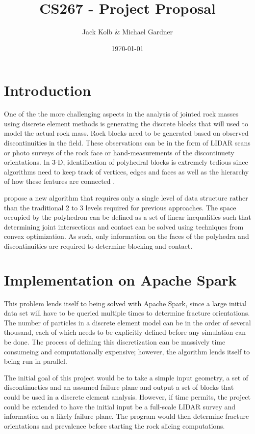 \documentclass[american]{article}
\begin{document}
\title{CS267 - Project Proposal}
\author{Jack Kolb \& Michael Gardner}
\date{\today}
\maketitle

\section{Introduction}
One of the the more challenging aspects in the analysis of jointed rock masses using discrete element methods is generating the discrete blocks that will used to model the actual rock mass. Rock blocks need to be generated based on observed discontinuities in the field. These observations can be in the form of LIDAR scans or photo surveys of the rock face or hand-measurements of the discontinuety orientations. In 3-D, identification of polyhedral blocks is extremely tedious since algorithms need to keep track of vertices, edges and faces as well as the hierarchy of how these features are connected \parencite{Collision}. \par
\textcite{Collision} propose a new algorithm that requires only a single level of data structure rather than the traditional 2 to 3 levels required for previous approaches. The space occupied by the polyhedron can be defined as a set of linear inequalities such that determining joint intersections and contact can be solved using techniques from convex optimization. As such, only information on the faces of the polyhedra and discontinuities are required to determine blocking and contact.

\section{Implementation on Apache Spark}
This problem lends itself to being solved with Apache Spark, since a large initial data set will have to be queried multiple times to determine fracture orientations. The number of particles in a discrete element model can be in the order of  several thousand, each of which needs to be explicitly defined before any simulation can be done. The process of defining this discretization can be massively time consumeing and computationally expensive; however, the algorithm lends itself to being run in parallel. \par
The initial goal of this project would be to take a simple input geometry, a set of discontinueties and an assumed failure plane and output a set of blocks that could be used in a discrete element analysis. However, if time permits, the project could be extended to have the initial input be a full-scale LIDAR survey and information on a likely failure plane. The program would then determine fracture orientations and prevalence before starting the rock slicing computations.  

\clearpage
\nocite{*}
\printbibliography
\end{document}
